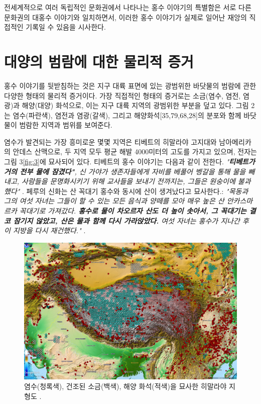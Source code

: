 \documentclass[10pt,twocolumn,letterpaper]{article}
\begin{document}
전세계적으로 여러 독립적인 문화권에서 나타나는 홍수 이야기의 특별함은  서로 다른 문화권의 대홍수 이야기와 일치하면서, 이러한 홍수 이야기가 실제로 일어난 재앙의 직접적인 기록일 수 있음을 시사한다.

\section{대양의 범람에 대한 물리적 증거}

홍수 이야기를 뒷받침하는 것은 지구 대륙 표면에 있는 광범위한 바닷물의 범람에 관한 다양한 형태의 물리적 증거이다. 가장 직접적인 형태의 증거로는  소금(염수, 염전, 염광)과 해양(대양) 화석으로, 이는 지구 대륙 지역의 광범위한 부분을 덮고 있다. 그림 2는 염수(파란색), 염전과 염광(갈색), 그리고 해양화석[35,79,68,28]의 분포와 함께 바닷물이 범람한 지역과 범위를 보여준다.

염수가 발견되는 가장 흥미로운 몇몇 지역은  티베트의 히말라야 고지대와 남아메리카의 안데스 산맥으로, 두 지역 모두 평균 해발 4000미터의 고도를 가지고 있으며, 전자는 그림 3\ref{fig:3}에 묘사되어 있다. 티베트의 홍수 이야기는 다음과 같이 전한다. \textit{"\textbf{티베트가 거의 전부 물에 잠겼다"}, 신 가야가 생존자들에게 자비를 베풀어 벵갈을 통해 물을 빼내고, 사람들을 문명화시키기 위해 교사들을 보내기 전까지는, 그들은 원숭이에 불과했다"} \cite{3}. 페루의 신화는 산 꼭대기 홍수와 동시에 산이 생겨났다고 묘사한다.: \textit{"목동과 그의 여섯 자녀는 그들이 할 수 있는 모든 음식과 양떼를 모아 매우 높은 산 안카스마르카 꼭대기로 가져갔다. \textbf{홍수로 물이 차오르자  산도 더 높이 솟아서, 그 꼭대기는 결코 잠기지 않았고, 산은 물과 함께 다시 가라앉았다.} 여섯 자녀는 홍수가 지나간 후  이 지방을 다시 재건했다."} \cite{3}.

\begin{figure}[t]
\begin{center}
   \includegraphics[width=1\linewidth]{tibet.jpg}
\end{center}
   \caption{염수(청록색), 건조된 소금(백색), 해양 화석(적색)을 묘사한 히말라야 지형도 \cite{15,16,86,87}.}
\label{fig:3}
\label{fig:onecol}
\end{figure}
\end{document}
